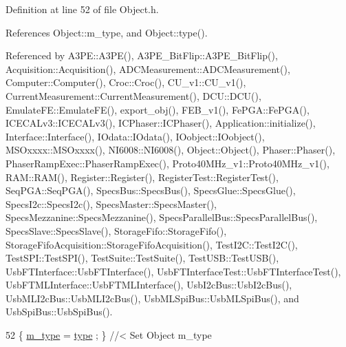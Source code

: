 Definition at line 52 of file Object.\+h.



References Object\+::m\+\_\+type, and Object\+::type().



Referenced by A3\+P\+E\+::\+A3\+P\+E(), A3\+P\+E\+\_\+\+Bit\+Flip\+::\+A3\+P\+E\+\_\+\+Bit\+Flip(), Acquisition\+::\+Acquisition(), A\+D\+C\+Measurement\+::\+A\+D\+C\+Measurement(), Computer\+::\+Computer(), Croc\+::\+Croc(), C\+U\+\_\+v1\+::\+C\+U\+\_\+v1(), Current\+Measurement\+::\+Current\+Measurement(), D\+C\+U\+::\+D\+C\+U(), Emulate\+F\+E\+::\+Emulate\+F\+E(), export\+\_\+obj(), F\+E\+B\+\_\+v1(), Fe\+P\+G\+A\+::\+Fe\+P\+G\+A(), I\+C\+E\+C\+A\+Lv3\+::\+I\+C\+E\+C\+A\+Lv3(), I\+C\+Phaser\+::\+I\+C\+Phaser(), Application\+::initialize(), Interface\+::\+Interface(), I\+Odata\+::\+I\+Odata(), I\+Oobject\+::\+I\+Oobject(), M\+S\+Oxxxx\+::\+M\+S\+Oxxxx(), N\+I6008\+::\+N\+I6008(), Object\+::\+Object(), Phaser\+::\+Phaser(), Phaser\+Ramp\+Exec\+::\+Phaser\+Ramp\+Exec(), Proto40\+M\+Hz\+\_\+v1\+::\+Proto40\+M\+Hz\+\_\+v1(), R\+A\+M\+::\+R\+A\+M(), Register\+::\+Register(), Register\+Test\+::\+Register\+Test(), Seq\+P\+G\+A\+::\+Seq\+P\+G\+A(), Specs\+Bus\+::\+Specs\+Bus(), Specs\+Glue\+::\+Specs\+Glue(), Specs\+I2c\+::\+Specs\+I2c(), Specs\+Master\+::\+Specs\+Master(), Specs\+Mezzanine\+::\+Specs\+Mezzanine(), Specs\+Parallel\+Bus\+::\+Specs\+Parallel\+Bus(), Specs\+Slave\+::\+Specs\+Slave(), Storage\+Fifo\+::\+Storage\+Fifo(), Storage\+Fifo\+Acquisition\+::\+Storage\+Fifo\+Acquisition(), Test\+I2\+C\+::\+Test\+I2\+C(), Test\+S\+P\+I\+::\+Test\+S\+P\+I(), Test\+Suite\+::\+Test\+Suite(), Test\+U\+S\+B\+::\+Test\+U\+S\+B(), Usb\+F\+T\+Interface\+::\+Usb\+F\+T\+Interface(), Usb\+F\+T\+Interface\+Test\+::\+Usb\+F\+T\+Interface\+Test(), Usb\+F\+T\+M\+L\+Interface\+::\+Usb\+F\+T\+M\+L\+Interface(), Usb\+I2c\+Bus\+::\+Usb\+I2c\+Bus(), Usb\+M\+L\+I2c\+Bus\+::\+Usb\+M\+L\+I2c\+Bus(), Usb\+M\+L\+Spi\+Bus\+::\+Usb\+M\+L\+Spi\+Bus(), and Usb\+Spi\+Bus\+::\+Usb\+Spi\+Bus().


\begin{DoxyCode}
52 \{ \hyperlink{classObject_a457a600fe8c00eb1034374f75110a78c}{m\_type}  = \hyperlink{classObject_a84f99f70f144a83e1582d1d0f84e4e62}{type}  ; \} \textcolor{comment}{//< Set Object m\_type}
\end{DoxyCode}
\mbox{\label{classFEB__v1_a76d86fb9e9be48e704257070675ae1cc}} 
